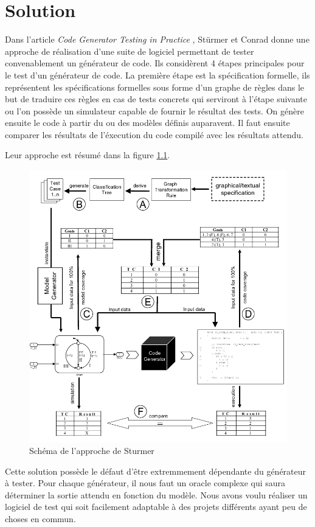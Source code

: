 \chapter{Solution}


Dans l'article \textit{Code Generator Testing in Practice} \cite{sturmer2004}, Stürmer et Conrad donne une approche de réalisation
d'une suite de logiciel permettant de tester convenablement un générateur de code.
Ils considèrent 4 étapes principales pour le test d'un générateur de code. La première étape est la spécification formelle, ils représentent les spécifications
formelles sous forme d'un graphe de règles dans le but de traduire ces règles en cas de tests concrets qui serviront à l'étape suivante ou l'on possède
un simulateur capable de fournir le résultat des tests. On génère ensuite le code à partir du ou des modèles définis auparavent. Il faut ensuite
comparer les résultats de l'éxecution du code compilé avec les résultats attendu.

Leur approche est résumé dans la figure \ref{codegen}.


\begin{figure}
	\centering
	\includegraphics[width=0.7\linewidth]{images/codegen.png}
	\caption{Schéma de l'approche de Sturmer}
	\label{codegen}
\end{figure}


Cette solution possède le défaut d'être extremmement dépendante du générateur à tester. Pour chaque générateur, il nous faut un oracle complexe
qui saura déterminer la sortie attendu en fonction du modèle. Nous avons voulu réaliser un logiciel de test qui soit facilement adaptable à des
projets différents ayant peu de choses en commun.

